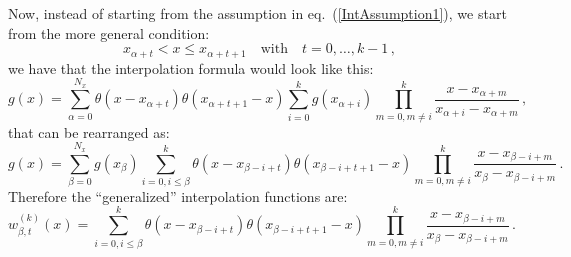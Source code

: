 \documentclass[10pt,a4paper]{article}
\begin{document}
Now, instead of starting from the assumption in
eq.~(\ref{IntAssumption1}), we start from the more general condition:
\begin{equation}\label{IntAssumptionGen}
x_{\alpha+t} < x \leq x_{\alpha+t+1}\quad\mbox{with}\quad t = 0,\dots,k-1\,,
\end{equation}
we have that the interpolation formula would look like this:
\begin{equation}\label{MoreGeneralCase}
g(x) = \sum_{\alpha=0}^{N_x}\theta(x-x_{\alpha+t})\theta(x_{\alpha+t+1}-x)\sum_{i=0}^k g(x_{\alpha+i})\prod^{k}_{m=0,m\ne i}\frac{x-x_{\alpha+m}}{x_{\alpha+i}-x_{\alpha+m}}\,,
\end{equation}
that can be rearranged as:
\begin{equation}\label{generalCase2}
g(x) = \sum_{\beta=0}^{N_x}g(x_{\beta}) \sum_{i=0,i\leq\beta}^k \theta(x-x_{\beta-i+t})\theta(x_{\beta-i+t+1}-x) \prod^{k}_{m=0,m\ne i}\frac{x-x_{\beta-i+m}}{x_{\beta}-x_{\beta-i+m}}\,.
\end{equation}
Therefore the ``generalized'' interpolation functions are:
\begin{equation}
w_{\beta,t}^{(k)}(x) = \sum_{i=0,i\leq\beta}^k \theta(x-x_{\beta-i+t})\theta(x_{\beta-i+t+1}-x) \prod^{k}_{m=0,m\ne i}\frac{x-x_{\beta-i+m}}{x_{\beta}-x_{\beta-i+m}}\,.
\end{equation}
\end{document}
